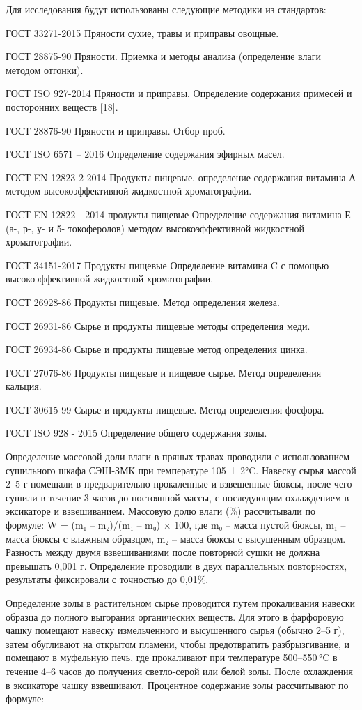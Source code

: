 \begin{multicols}{2}
Для исследования будут использованы следующие методики из стандартов:

ГОСТ 33271-2015 Пряности сухие, травы и приправы овощные.

ГОСТ 28875-90 Пряности. Приемка и методы анализа (определение влаги
методом отгонки).

ГОСТ ISO 927-2014 Пряности и приправы. Определение содержания примесей и
посторонних веществ {[}18{]}.

ГОСТ 28876-90 Пряности и приправы. Отбор проб.

ГОСТ ISO 6571 -- 2016 Определение содержания эфирных масел.

ГОСТ EN 12823-2-2014 Продукты пищевые. определение содержания витамина А
методом высокоэффективной жидкостной хроматографии.

ГОСТ EN 12822---2014 продукты пищевые Определение содержания витамина Е
(а-, р-, у- и 5- токоферолов) методом высокоэффективной жидкостной
хроматографии.

ГОСТ 34151-2017 Продукты пищевые Определение витамина C с помощью
высокоэффективной жидкостной хроматографии.

ГОСТ 26928-86 Продукты пищевые. Метод определения железа.

ГОСТ 26931-86 Сырье и продукты пищевые методы определения меди.

ГОСТ 26934-86 Сырье и продукты пищевые метод определения цинка.

ГОСТ 27076-86 Продукты пищевые и пищевое сырье. Метод определения
кальция.

ГОСТ 30615-99 Сырье и продукты пищевые. Метод определения фосфора.

ГОСТ ISO 928 - 2015 Определение общего содержания золы.

Определение массовой доли влаги в пряных травах проводили с
использованием сушильного шкафа СЭШ-ЗМК при температуре 105 ± 2°C.
Навеску сырья массой 2--5 г помещали в предварительно прокаленные и
взвешенные бюксы, после чего сушили в течение 3 часов до постоянной
массы, с последующим охлаждением в эксикаторе и взвешиванием. Массовую
долю влаги (\%) рассчитывали по формуле: W = (m₁ -- m₂)/(m₁ -- m₀) ×
100, где m₀ -- масса пустой бюксы, m₁ -- масса бюксы с влажным образцом,
m₂ -- масса бюксы с высушенным образцом. Разность между двумя
взвешиваниями после повторной сушки не должна превышать 0,001 г.
Определение проводили в двух параллельных повторностях, результаты
фиксировали с точностью до 0,01\%.

Определение золы в растительном сырье проводится путем прокаливания
навески образца до полного выгорания органических веществ. Для этого в
фарфоровую чашку помещают навеску измельченного и высушенного сырья
(обычно 2--5 г), затем обугливают на открытом пламени, чтобы
предотвратить разбрызгивание, и помещают в муфельную печь, где
прокаливают при температуре 500--550\,°C в течение 4--6 часов до
получения светло-серой или белой золы. После охлаждения в эксикаторе
чашку взвешивают. Процентное содержание золы рассчитывают по формуле:


\end{multicols}
